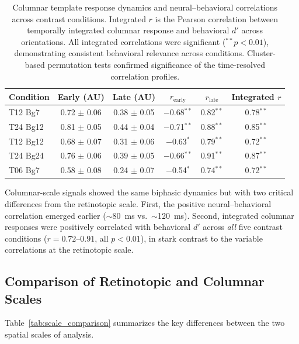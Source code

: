 \documentclass[11pt]{article}
\begin{document}
\begin{table}[H]
\centering
\caption{Columnar template response dynamics and neural--behavioral correlations across contrast conditions. Integrated $r$ is the Pearson correlation between temporally integrated columnar response and behavioral $d'$ across orientations. All integrated correlations were significant ($^{\ast\ast}p < 0.01$), demonstrating consistent behavioral relevance across conditions. Cluster-based permutation tests confirmed significance of the time-resolved correlation profiles.}
\label{tab:columnar}
\begin{tabular}{lccccc}
\toprule
\textbf{Condition} & \textbf{Early (AU)} & \textbf{Late (AU)} & \textbf{$r_{\mathrm{early}}$} & \textbf{$r_{\mathrm{late}}$} & \textbf{Integrated $r$} \\
\midrule
T12 Bg7 & 0.72 $\pm$ 0.06 & 0.38 $\pm$ 0.05 & $-$0.68$^{\ast\ast}$ & 0.82$^{\ast\ast}$ & 0.78$^{\ast\ast}$ \\
T24 Bg12 & 0.81 $\pm$ 0.05 & 0.44 $\pm$ 0.04 & $-$0.71$^{\ast\ast}$ & 0.88$^{\ast\ast}$ & 0.85$^{\ast\ast}$ \\
T12 Bg12 & 0.68 $\pm$ 0.07 & 0.31 $\pm$ 0.06 & $-$0.63$^{\ast}$ & 0.79$^{\ast\ast}$ & 0.72$^{\ast\ast}$ \\
T24 Bg24 & 0.76 $\pm$ 0.06 & 0.39 $\pm$ 0.05 & $-$0.66$^{\ast\ast}$ & 0.91$^{\ast\ast}$ & 0.87$^{\ast\ast}$ \\
T06 Bg7 & 0.58 $\pm$ 0.08 & 0.24 $\pm$ 0.07 & $-$0.54$^{\ast}$ & 0.74$^{\ast\ast}$ & 0.72$^{\ast\ast}$ \\
\bottomrule
\end{tabular}
\end{table}

Columnar-scale signals showed the same biphasic dynamics but with two critical differences from the retinotopic scale. First, the positive neural--behavioral correlation emerged earlier ($\sim$80~ms vs.\ $\sim$120~ms). Second, integrated columnar responses were positively correlated with behavioral $d'$ across \emph{all} five contrast conditions ($r = 0.72$--$0.91$, all $p < 0.01$), in stark contrast to the variable correlations at the retinotopic scale.

\subsection{Comparison of Retinotopic and Columnar Scales}

Table~\ref{tab:scale_comparison} summarizes the key differences between the two spatial scales of analysis.
\end{document}
